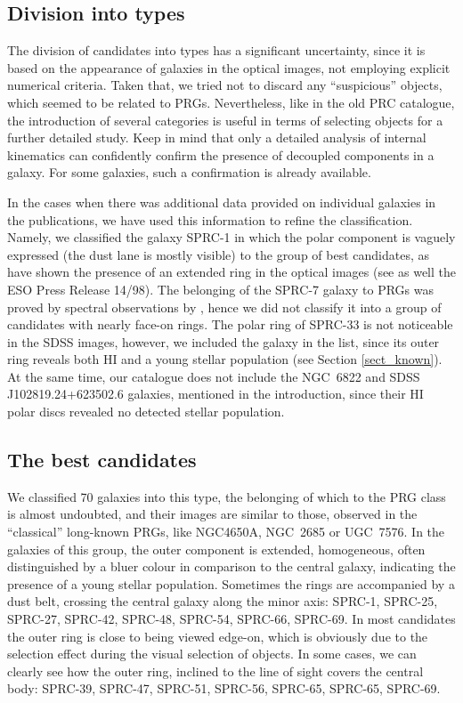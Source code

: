 \documentclass[useAMS,usenatbib]{mn2e}
\begin{document}
\subsection{Division into types}


The division of candidates into types has a significant
uncertainty, since it is based on the appearance of galaxies in
the optical images, not employing explicit numerical criteria.
Taken that, we tried not to discard any ``suspicious'' objects,
which seemed to be related to PRGs. Nevertheless, like in the old
PRC catalogue, the introduction of several categories is useful in
terms of selecting objects for a further detailed study. Keep in
mind that only a detailed analysis of internal kinematics can
confidently confirm the presence of decoupled
components in a galaxy. For some galaxies, such a confirmation is
already available.


In the cases when there was additional data provided on individual
galaxies in the publications,   we have used this information to refine the classification.
Namely, we classified the galaxy SPRC-1 in which
the polar component is vaguely expressed (the dust lane is mostly visible)
to the group of best candidates, as \citet{Resh2011}  have shown
the presence of an extended ring in the optical images (see as well the ESO Press Release 14/98). The
belonging of the SPRC-7 galaxy to PRGs was proved by spectral
observations by \citet{Brosch2010}, hence we did not classify it
into a group of candidates with nearly face-on rings. The polar ring
of SPRC-33 is not noticeable in the SDSS
images, however, we included the galaxy in the list, since its
outer ring reveals both HI and a young stellar population
(see Section \ref{sect_known}). At the same time, our catalogue
does not include the NGC~6822 and SDSS J102819.24+623502.6
galaxies, mentioned in the introduction, since their HI polar discs
revealed no detected stellar population.



\subsection{The best candidates}

We classified  70 galaxies  into this type, the belonging of  which
to the PRG class is almost undoubted, and their images are similar
to those, observed in the ``classical'' long-known PRGs, like
NGC4650A, NGC~2685 or UGC~7576. In the galaxies of this group,
the outer component is extended,
homogeneous, often distinguished by a bluer colour in comparison
to the central galaxy, indicating the presence of a young stellar
population. Sometimes the rings are accompanied by a dust belt,
crossing the central galaxy along the minor axis: SPRC-1, SPRC-25,
SPRC-27, SPRC-42, SPRC-48, SPRC-54, SPRC-66, SPRC-69. In most
candidates the outer ring is close to being viewed edge-on,
which is obviously due to the selection effect during the visual
selection of objects. In some cases, we can clearly see how the
outer ring, inclined to the line of sight covers the central body:
SPRC-39, SPRC-47, SPRC-51, SPRC-56, SPRC-65, SPRC-65,  SPRC-69.
\end{document}
